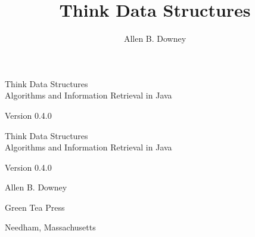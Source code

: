 \documentclass[12pt]{book}
\title{Think Data Structures}
\author{Allen B. Downey}
\newcommand{\thetitle}{Think Data Structures}
\newcommand{\thesubtitle}{Algorithms and Information Retrieval in Java}
\newcommand{\theauthors}{Allen B. Downey}
\newcommand{\theversion}{0.4.0}
\theoremstyle{exercise}
\newif\ifplastex
\begin{document}
\frontmatter

\ifplastex

\maketitle

\else

\begin{latexonly}

\thispagestyle{empty}

\begin{flushright}
\vspace*{2.0in}

\begin{spacing}{3}
{\huge \thetitle} \\
{\Large \thesubtitle}
\end{spacing}

\vspace{0.25in}

Version \theversion

\vfill
\end{flushright}

\newpage
\thispagestyle{empty}

\quad

\newpage
\thispagestyle{empty}

\begin{flushright}
\vspace*{2.0in}

\begin{spacing}{3}
{\huge \thetitle} \\
{\Large \thesubtitle}
\end{spacing}

\vspace{0.25in}

Version \theversion

\vspace{1in}

{\Large \theauthors}

\vspace{0.5in}

{\Large Green Tea Press}

{\small Needham, Massachusetts}

\vfill
\end{flushright}


\end{latexonly}
\end{document}

